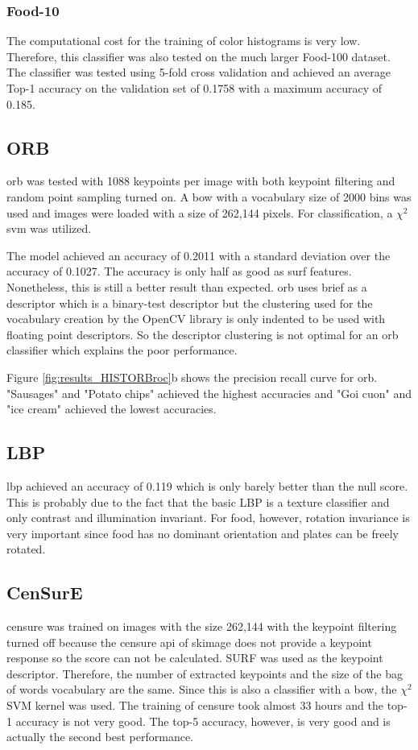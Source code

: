 \subsubsection*{Food-10}

The computational cost for the training of color histograms is very low. Therefore, this classifier was also tested on the much larger Food-100 dataset. The classifier was tested using 5-fold cross validation and achieved an average Top-1 accuracy on the validation set of 0.1758 with a maximum accuracy of 0.185.

\subsection{ORB}

\gls{orb} was tested with 1088 keypoints per image with both keypoint filtering and random point sampling turned on. A \gls{bow} with a vocabulary size of 2000 bins was used and images were loaded with a size of 262,144 pixels. For classification, a $\chi^2$ \gls{svm} was utilized.

The model achieved an accuracy of 0.2011 with a standard deviation over the accuracy of 0.1027. The accuracy is only half as good as \gls{surf} features. Nonetheless, this is still a better result than expected. \gls{orb} uses \gls{brief} as a descriptor which is a binary-test descriptor but the clustering used for the vocabulary creation by the OpenCV library is only indented to be used with floating point descriptors. So the descriptor clustering is not optimal for an \gls{orb} classifier which explains the poor performance.

Figure \ref{fig:results_HISTORBroc}b shows the precision recall curve for \gls{orb}. "Sausages" and "Potato chips" achieved the highest accuracies and "Goi cuon" and "ice cream" achieved the lowest accuracies.

\subsection{LBP}
\gls{lbp} achieved an accuracy of 0.119 which is only barely better than the null score. This is probably due to the fact that the basic LBP is a texture classifier and only contrast and illumination invariant. For food, however, rotation invariance is very important since food has no dominant orientation and plates can be freely rotated.
\subsection{CenSurE}
\gls{censure} was trained on images with the size 262,144 with the keypoint filtering turned off because the \gls{censure} \gls{api} of skimage does not provide a keypoint response so the score can not be calculated. SURF was used as the keypoint descriptor. Therefore, the number of extracted keypoints and the size of the bag of words vocabulary are the same. Since this is also a classifier with a \gls{bow}, the $\chi^2$ SVM kernel was used. The training of \gls{censure} took almost 33 hours and the top-1 accuracy is not very good. The top-5 accuracy, however, is very good and is actually the second best performance.

